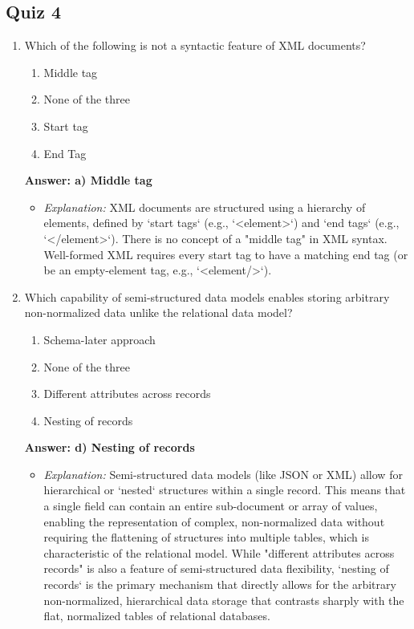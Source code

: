 \documentclass{article}
\begin{document}
\subsection*{Quiz 4}

\begin{enumerate}[label=\textbf{Question \arabic*.}]

    \item Which of the following is not a syntactic feature of XML documents?
        \begin{enumerate}[label=\alph*)]
            \item Middle tag
            \item None of the three
            \item Start tag
            \item End Tag
        \end{enumerate}
        \textbf{Answer: a) Middle tag}
        \begin{itemize}
            \item \textit{Explanation:} XML documents are structured using a hierarchy of elements, defined by `start tags` (e.g., `<element>`) and `end tags` (e.g., `</element>`). There is no concept of a "middle tag" in XML syntax. Well-formed XML requires every start tag to have a matching end tag (or be an empty-element tag, e.g., `<element/>`).
        \end{itemize}
    
    \item Which capability of semi-structured data models enables storing arbitrary non-normalized data unlike the relational data model?
        \begin{enumerate}[label=\alph*)]
            \item Schema-later approach
            \item None of the three
            \item Different attributes across records
            \item Nesting of records
        \end{enumerate}
        \textbf{Answer: d) Nesting of records}
        \begin{itemize}
            \item \textit{Explanation:} Semi-structured data models (like JSON or XML) allow for hierarchical or `nested` structures within a single record. This means that a single field can contain an entire sub-document or array of values, enabling the representation of complex, non-normalized data without requiring the flattening of structures into multiple tables, which is characteristic of the relational model. While "different attributes across records" is also a feature of semi-structured data flexibility, `nesting of records` is the primary mechanism that directly allows for the arbitrary non-normalized, hierarchical data storage that contrasts sharply with the flat, normalized tables of relational databases.
        \end{itemize}
    

\end{enumerate}
\end{document}
